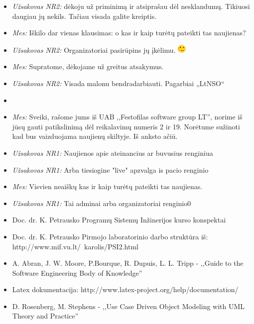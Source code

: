 \documentclass{VUMIFPSkursinis}
\begin{document}
\begin{itemize}
\begin{itemize}
						\item \textit{Užsakovas NR2:} dėkoju už priminimą ir atsiprašau dėl nesklandumų. Tikiuosi daugiau jų nekils. Tačiau visada galite kreiptis.
						\item \textit{Mes:} Iškilo dar vienas klausimas: o kas ir kaip turėtų pateikti tas naujienas?
						\item \textit{Užsakovas NR2:} Organizatoriai pasirūpins jų įkėlimu. \includegraphics{img/PSI4/smile.png}
						\item \textit{Mes:} Supratome, dėkojame už greitus atsakymus.
						\item \textit{Užsakovas NR2:} Visada malonu bendradarbiauti. Pagarbiai „LtNSO“
						\item[ ]
						\item \textit{Mes:} Sveiki, rašome jums iš UAB ,,Festofilas software group LT'', norime iš jūsų gauti patikslinimą dėl reikalavimų numeris 2 ir 19. Norėtume sužinoti kad bus vaizduojama naujienų skiltyje. Iš anksto ačiū.
						\item \textit{Užsakovas NR1:} Naujienos apie ateinancius ar buvusius renginiua
						\item \textit{Užsakovas NR1:} Arba tiesiogine "live" apzvalga is pacio renginio
						\item \textit{Mes:} Visvien neaiškų kas ir kaip turėtų pateikti tas naujienas.
						\item \textit{Užsakovas NR1:} Tai adminai arba organizatoriai renginio0
					\end{itemize}
			\end{itemize}
			
        \begin{itemize}
			\item Doc. dr. K. Petrausko Programų Sistemų Inžinerijos kurso konspektai
			\item Doc. dr. K. Petrausko Pirmojo laboratorinio darbo struktūra iš: http://www.mif.vu.lt/~karolis/PSI2.html
			\item A. Abran, J. W. Moore, P.Bourque, R. Dupuis, L. L. Tripp - ,,Guide to the Software Engineering Body of Knowledge''
			\item Latex dokumentacija: http://www.latex-project.org/help/documentation/
			\item D. Rosenberg, M. Stephens - ,,Use Case Driven Object Modeling with UML Theory and Practice''
        \end{itemize}
\end{document}

